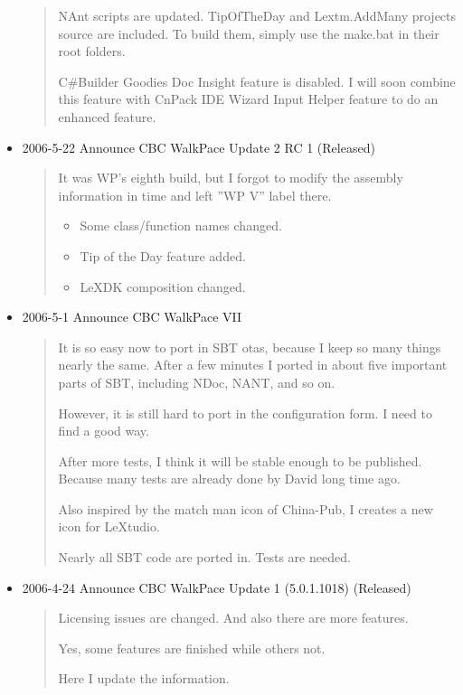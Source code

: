 \begin{itemize}
\begin{quotation}
    NAnt scripts are updated. TipOfTheDay and Lextm.AddM\-an\-y projects
    source are included. To build them, simply use the make.bat in their
    root folders.

    C\#Builder Goodies Doc Insight feature is disabled. I will soon
    combine this feature with CnPack IDE Wizard Input H\-elp\-er feature
    to do an enhanced feature.
  \end{quotation}
  \item 2006-5-22 Announce CBC WalkPace Update 2 RC 1 (Released)

  \begin{quotation}
    It was WP's eighth build, but I forgot to modify the assembly
    information in time and left ''WP V'' label there.
    \begin{itemize}
      \item Some class/function names changed.
      \item Tip of the Day feature added.
      \item LeXDK composition changed.
    \end{itemize}
  \end{quotation}
  \item 2006-5-1 Announce CBC WalkPace VII

  \begin{quotation}
    It is so easy now to port in SBT otas, because I keep so many
    things nearly the same. After a few minutes I ported in about five
    important parts of SBT, including NDoc, NANT, and so on.

    However, it is still hard to port in the configuration form. I need
    to find a good way.

    After more tests, I think it will be stable enough to be published.
    Because many tests are already done by David long time ago.

    Also inspired by the match man icon of China-Pub, I creates a new
    icon for LeXtudio.

    Nearly all SBT code are ported in. Tests are needed.
  \end{quotation}
  \item 2006-4-24 Announce CBC WalkPace Update 1 (5.0.1.1018)
  (Released)

  \begin{quotation}
    Licensing issues are changed. And also there are more features.

    Yes, some features are finished while others not.

    Here I update the information.


\end{quotation}
\end{itemize}
